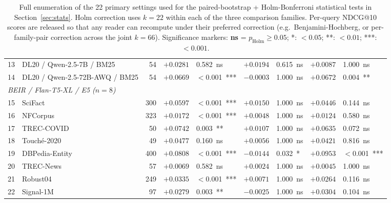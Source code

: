 \documentclass[sigconf]{acmart}
\begin{document}
\begin{table}[t]
\begin{tabular}{rlrrlrlrl}
13 & DL20 / Qwen-2.5-7B / BM25        & 54  & $+0.0281$ & 0.582~ns       & $+0.0194$ & 0.615~ns     & $+0.0087$ & 1.000~ns \\
14 & DL20 / Qwen-2.5-72B-AWQ / BM25   & 54  & $+0.0669$ & $<$0.001~***   & $-0.0003$ & 1.000~ns     & $+0.0672$ & 0.004~** \\
\midrule
\multicolumn{9}{l}{\emph{BEIR / Flan-T5-XL / E5 ($n=8$)}}\\
15 & SciFact                          & 300 & $+0.0597$ & $<$0.001~***   & $+0.0150$ & 1.000~ns     & $+0.0446$ & 0.144~ns \\
16 & NFCorpus                         & 323 & $+0.0172$ & $<$0.001~***   & $+0.0048$ & 1.000~ns     & $+0.0124$ & 0.580~ns \\
17 & TREC-COVID                       & 50  & $+0.0742$ & 0.003~**       & $+0.0107$ & 1.000~ns     & $+0.0635$ & 0.072~ns \\
18 & Touch\'e-2020                    & 49  & $+0.0477$ & 0.160~ns       & $+0.0056$ & 1.000~ns     & $+0.0421$ & 0.816~ns \\
19 & DBPedia-Entity                   & 400 & $+0.0808$ & $<$0.001~***   & $-0.0144$ & 0.032~*      & $+0.0953$ & $<$0.001~*** \\
20 & TREC-News                        & 57  & $+0.0069$ & 0.582~ns       & $+0.0024$ & 1.000~ns     & $+0.0045$ & 1.000~ns \\
21 & Robust04                         & 249 & $+0.0335$ & $<$0.001~***   & $+0.0071$ & 1.000~ns     & $+0.0264$ & 0.116~ns \\
22 & Signal-1M                        & 97  & $+0.0279$ & 0.003~**       & $-0.0025$ & 1.000~ns     & $+0.0304$ & 0.104~ns \\
\bottomrule
\end{tabular}
\caption{Full enumeration of the 22 primary settings used for the
paired-bootstrap + Holm-Bonferroni statistical tests in
Section~\ref{sec:stats}. Holm correction uses $k=22$ within each
of the three comparison families. Per-query NDCG@10 scores are
released so that any reader can recompute under their preferred
correction (e.g.\ Benjamini-Hochberg, or per-family-pair correction
across the joint $k=66$). Significance markers: \textbf{ns} =
$p_{\text{Holm}}\geq 0.05$; *: $<0.05$; **: $<0.01$; ***: $<0.001$.}
\label{tab:full-stats}
\end{table}



\end{document}
